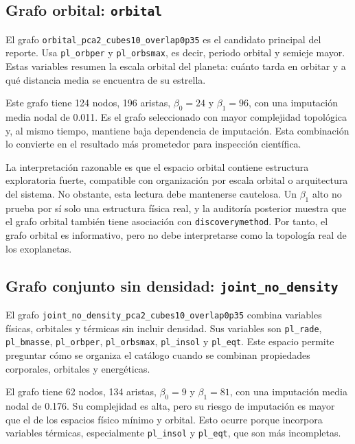 \subsection*{Grafo orbital: \texttt{orbital}}

El grafo \texttt{orbital\_pca2\_cubes10\_overlap0p35} es el candidato principal del reporte. Usa \texttt{pl\_orbper} y \texttt{pl\_orbsmax}, es decir, periodo orbital y semieje mayor. Estas variables resumen la escala orbital del planeta: cuánto tarda en orbitar y a qué distancia media se encuentra de su estrella.

Este grafo tiene 124 nodos, 196 aristas, $\beta_0=24$ y $\beta_1=96$, con una imputación media nodal de 0.011. Es el grafo seleccionado con mayor complejidad topológica y, al mismo tiempo, mantiene baja dependencia de imputación. Esta combinación lo convierte en el resultado más prometedor para inspección científica.

La interpretación razonable es que el espacio orbital contiene estructura exploratoria fuerte, compatible con organización por escala orbital o arquitectura del sistema. No obstante, esta lectura debe mantenerse cautelosa. Un $\beta_1$ alto no prueba por sí solo una estructura física real, y la auditoría posterior muestra que el grafo orbital también tiene asociación con \texttt{discoverymethod}. Por tanto, el grafo orbital es informativo, pero no debe interpretarse como la topología real de los exoplanetas.

\subsection*{Grafo conjunto sin densidad: \texttt{joint\_no\_density}}

El grafo \texttt{joint\_no\_density\_pca2\_cubes10\_overlap0p35} combina variables físicas, orbitales y térmicas sin incluir densidad. Sus variables son \texttt{pl\_rade}, \texttt{pl\_bmasse}, \texttt{pl\_orbper}, \texttt{pl\_orbsmax}, \texttt{pl\_insol} y \texttt{pl\_eqt}. Este espacio permite preguntar cómo se organiza el catálogo cuando se combinan propiedades corporales, orbitales y energéticas.

El grafo tiene 62 nodos, 134 aristas, $\beta_0=9$ y $\beta_1=81$, con una imputación media nodal de 0.176. Su complejidad es alta, pero su riesgo de imputación es mayor que el de los espacios físico mínimo y orbital. Esto ocurre porque incorpora variables térmicas, especialmente \texttt{pl\_insol} y \texttt{pl\_eqt}, que son más incompletas.

